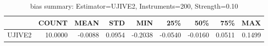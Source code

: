 \begin{table}[ht]
\centering
\caption{bias summary: Estimator=UJIVE2, Instruments=200, Strength=0.10}
\begin{tabular}{lrrrrrrrr}
\toprule
 & COUNT & MEAN & STD & MIN & 25\% & 50\% & 75\% & MAX \\
\midrule
UJIVE2 & 10.0000 & -0.0088 & 0.0954 & -0.2038 & -0.0540 & -0.0160 & 0.0511 & 0.1499 \\
\bottomrule
\end{tabular}
\end{table}
